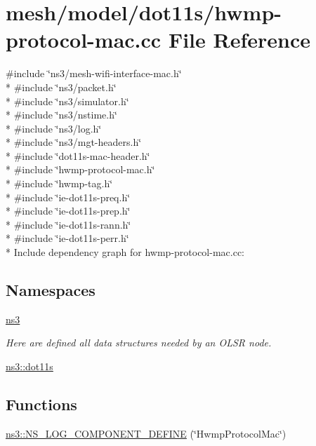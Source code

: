 \hypertarget{hwmp-protocol-mac_8cc}{}\section{mesh/model/dot11s/hwmp-\/protocol-\/mac.cc File Reference}
\label{hwmp-protocol-mac_8cc}
{\ttfamily \#include \char`\"{}ns3/mesh-\/wifi-\/interface-\/mac.\+h\char`\"{}}\\*
{\ttfamily \#include \char`\"{}ns3/packet.\+h\char`\"{}}\\*
{\ttfamily \#include \char`\"{}ns3/simulator.\+h\char`\"{}}\\*
{\ttfamily \#include \char`\"{}ns3/nstime.\+h\char`\"{}}\\*
{\ttfamily \#include \char`\"{}ns3/log.\+h\char`\"{}}\\*
{\ttfamily \#include \char`\"{}ns3/mgt-\/headers.\+h\char`\"{}}\\*
{\ttfamily \#include \char`\"{}dot11s-\/mac-\/header.\+h\char`\"{}}\\*
{\ttfamily \#include \char`\"{}hwmp-\/protocol-\/mac.\+h\char`\"{}}\\*
{\ttfamily \#include \char`\"{}hwmp-\/tag.\+h\char`\"{}}\\*
{\ttfamily \#include \char`\"{}ie-\/dot11s-\/preq.\+h\char`\"{}}\\*
{\ttfamily \#include \char`\"{}ie-\/dot11s-\/prep.\+h\char`\"{}}\\*
{\ttfamily \#include \char`\"{}ie-\/dot11s-\/rann.\+h\char`\"{}}\\*
{\ttfamily \#include \char`\"{}ie-\/dot11s-\/perr.\+h\char`\"{}}\\*
Include dependency graph for hwmp-\/protocol-\/mac.cc\+:
\subsection*{Namespaces}
\begin{DoxyCompactItemize}
\item 
 \hyperlink{namespacens3}{ns3}
\begin{DoxyCompactList}\small\item\em Here are defined all data structures needed by an O\+L\+SR node. \end{DoxyCompactList}\item 
 \hyperlink{namespacens3_1_1dot11s}{ns3\+::dot11s}
\end{DoxyCompactItemize}
\subsection*{Functions}
\begin{DoxyCompactItemize}
\item 
\hyperlink{namespacens3_ae5e7cdaf1e10c20505c5536b5f4d0e27}{ns3\+::\+N\+S\+\_\+\+L\+O\+G\+\_\+\+C\+O\+M\+P\+O\+N\+E\+N\+T\+\_\+\+D\+E\+F\+I\+NE} (\char`\"{}Hwmp\+Protocol\+Mac\char`\"{})
\end{DoxyCompactItemize}

